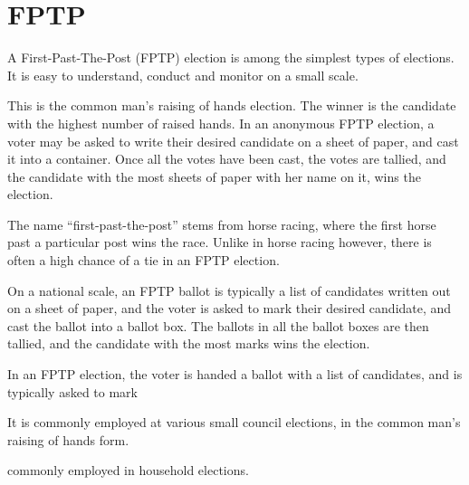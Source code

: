 \chapter{FPTP}

A First-Past-The-Post (FPTP) election is among the simplest types of elections.
It is easy to understand, conduct and monitor on a small scale.

This is the common man's raising of hands election. The winner is the candidate
with the highest number of raised hands. In an anonymous FPTP election, a voter
may be asked to write their desired candidate on a sheet of paper, and cast it
into a container. Once all the votes have been cast, the votes are tallied, and
the candidate with the most sheets of paper with her name on it, wins the
election.

The name ``first-past-the-post'' stems from horse racing, where the first horse
past a particular post wins the race. Unlike in horse racing however, there is
often a high chance of a tie in an FPTP election.

On a national scale, an FPTP ballot is typically a list of candidates written
out on a sheet of paper, and the voter is asked to mark their desired
candidate, and cast the ballot into a ballot box. The ballots in all the ballot
boxes are then tallied, and the candidate with the most marks wins the
election.

In an FPTP election, the voter is handed a ballot with a list of candidates, and is typically asked to mark

It is commonly
employed at various small council elections, in the common man's raising of
hands form.

commonly employed in
household elections.
